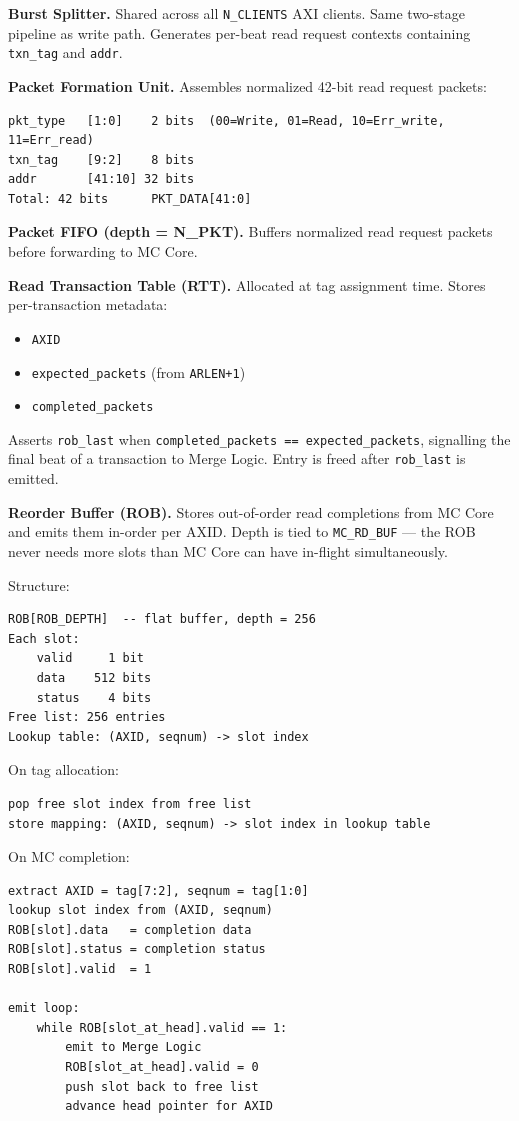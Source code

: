 \textbf{Burst Splitter.}
Shared across all \texttt{N\_CLIENTS} AXI clients. Same two-stage pipeline as write path. Generates per-beat read request contexts containing \texttt{txn\_tag} and \texttt{addr}.

\textbf{Packet Formation Unit.}
Assembles normalized 42-bit read request packets:
\begin{lstlisting}
pkt_type   [1:0]    2 bits  (00=Write, 01=Read, 10=Err_write, 11=Err_read)
txn_tag    [9:2]    8 bits
addr       [41:10] 32 bits
Total: 42 bits      PKT_DATA[41:0]
\end{lstlisting}

\textbf{Packet FIFO (depth = N\_PKT).}
Buffers normalized read request packets before forwarding to MC Core.

\textbf{Read Transaction Table (RTT).}
Allocated at tag assignment time. Stores per-transaction metadata:
\begin{itemize}[noitemsep]
    \item \texttt{AXID}
    \item \texttt{expected\_packets} (from \texttt{ARLEN+1})
    \item \texttt{completed\_packets}
\end{itemize}
Asserts \texttt{rob\_last} when \texttt{completed\_packets == expected\_packets}, signalling the final beat of a transaction to Merge Logic. Entry is freed after \texttt{rob\_last} is emitted.

\textbf{Reorder Buffer (ROB).}
Stores out-of-order read completions from MC Core and emits them in-order per AXID. Depth is tied to \texttt{MC\_RD\_BUF} — the ROB never needs more slots than MC Core can have in-flight simultaneously.

Structure:
\begin{lstlisting}
ROB[ROB_DEPTH]  -- flat buffer, depth = 256
Each slot:
    valid     1 bit
    data    512 bits
    status    4 bits
Free list: 256 entries
Lookup table: (AXID, seqnum) -> slot index
\end{lstlisting}

On tag allocation:
\begin{lstlisting}
pop free slot index from free list
store mapping: (AXID, seqnum) -> slot index in lookup table
\end{lstlisting}

On MC completion:
\begin{lstlisting}
extract AXID = tag[7:2], seqnum = tag[1:0]
lookup slot index from (AXID, seqnum)
ROB[slot].data   = completion data
ROB[slot].status = completion status
ROB[slot].valid  = 1

emit loop:
    while ROB[slot_at_head].valid == 1:
        emit to Merge Logic
        ROB[slot_at_head].valid = 0
        push slot back to free list
        advance head pointer for AXID
\end{lstlisting}

